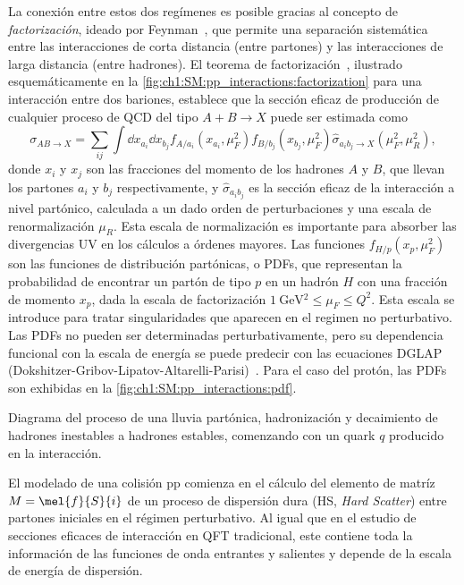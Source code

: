 La conexión entre estos dos regímenes es posible gracias al concepto de \textit{factorización}, ideado por Feynman~\cite{Feynman1969}, que permite una separación sistemática entre las interacciones de corta distancia (entre partones) y las interacciones de larga distancia (entre hadrones). El teorema de factorización~\cite{Collins1989}, ilustrado esquemáticamente en la \cref{fig:ch1:SM:pp_interactions:factorization} para una interacción entre dos bariones, establece que la sección eficaz de producción de cualquier proceso de QCD del tipo $A + B \to X$ puede ser estimada como
\begin{equation}
  \sigma_{AB \to X} = \sum_{ij} \int \dd{x_{a_i}} \dd{x_{b_j}} f_{A/a_i}(x_{a_i}, \mu_F^2) f_{B/b_j}(x_{b_j}, \mu_F^2) \hat{\sigma}_{a_i b_j \to X}(\mu_F^2, \mu_R^2), \label{eq:ch1:SM:factorization}
\end{equation}
donde $x_i$ y $x_j$ son las fracciones del momento de los hadrones $A$ y $B$, que llevan los partones $a_i$ y $b_j$ respectivamente, y $\hat{\sigma}_{a_i b_j}$ es la sección eficaz de la interacción a nivel partónico, calculada a un dado orden de perturbaciones y una escala de renormalización $\mu_R$. Esta escala de normalización es importante para absorber las divergencias UV en los cálculos a órdenes mayores. Las funciones $f_{H/p}(x_p,\mu_F^2)$ son las funciones de distribución partónicas, o PDFs, que representan la probabilidad de encontrar un partón de tipo $p$ en un hadrón $H$ con una fracción de momento $x_p$, dada la escala de factorización $\SI{1}{\GeV^2} \leq \mu_F \leq Q^2$. Esta escala se introduce para tratar singularidades que aparecen en el regimen no perturbativo. Las PDFs no pueden ser determinadas perturbativamente, pero su dependencia funcional con la escala de energía se puede predecir con las ecuaciones DGLAP (Dokshitzer-Gribov-Lipatov-Altarelli-Parisi)~. Para el caso del protón, las PDFs son exhibidas en la \cref{fig:ch1:SM:pp_interactions:pdf}.

\begin{marginfigure}[2em]
  \centering
  
  \caption{Diagrama del proceso de una lluvia partónica, hadronización y decaimiento de hadrones inestables a hadrones estables, comenzando con un quark $q$ producido en la interacción.}
  \label{fig:ch1:SM:pp_interactions:hadron_production}
\end{marginfigure}

El modelado de una colisión pp comienza en el cálculo del elemento de matríz $M = 
\mel{f}{S}{i}$ de un proceso de dispersión dura (HS, \textit{Hard Scatter}) entre partones iniciales en el régimen perturbativo. Al igual que en el estudio de secciones eficaces de interacción en QFT tradicional, este contiene toda la información de las funciones de onda entrantes y salientes y depende de la escala de energía de dispersión.

